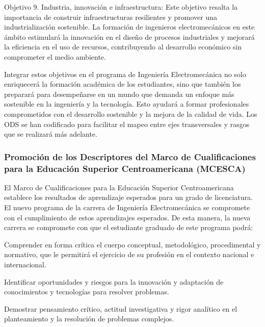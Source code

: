 \begin{cuadrocafe}[ODS09]
Objetivo 9. Industria, innovación e infraestructura: Este objetivo resalta la importancia de construir infraestructuras resilientes y promover una industrialización sostenible. La formación de ingenieros electromecánicos en este ámbito estimulará la innovación en el diseño de procesos industriales y mejorará la eficiencia en el uso de recursos, contribuyendo al desarrollo económico sin comprometer el medio ambiente.
\end{cuadrocafe}

Integrar estos objetivos en el programa de Ingeniería Electromecánica no solo enriquecerá la formación académica de los estudiantes, sino que también los preparará para desempeñarse en un mundo que demanda un enfoque más sostenible en la ingeniería y la tecnología. Esto ayudará a formar profesionales comprometidos con el desarrollo sostenible y la mejora de la calidad de vida. Los ODS se han codificado para facilitar el mapeo entre ejes transversales y rasgos que se realizará más adelante.\par

\subsubsection*{Promoción de los Descriptores del Marco de Cualificaciones para la Educación Superior Centroamericana (MCESCA)}

El Marco de Cualificaciones para la Educación Superior Centroamericana establece los resultados de aprendizaje esperados para un grado de licenciatura. El nuevo programa de la carrera de Ingeniería Electromecánica se compromete con el cumplimiento de estos aprendizajes esperados. De esta manera, la nueva carrera se compromete con que el estudiante graduado de este programa podrá:\par

\begin{cuadrocafe}[MCA01]
Comprender en forma crítica el cuerpo conceptual, metodológico, procedimental y normativo, que le permitirá el ejercicio de su profesión en el contexto nacional e internacional.
\end{cuadrocafe}

\begin{cuadrocafe}[MCA02]
Identificar oportunidades y riesgos para la innovación y adaptación de conocimientos y tecnologías para resolver problemas.
\end{cuadrocafe}

\begin{cuadrocafe}[MCA03]
Demostrar pensamiento crítico, actitud investigativa y rigor analítico en el planteamiento y la resolución de problemas complejos.
\end{cuadrocafe}

